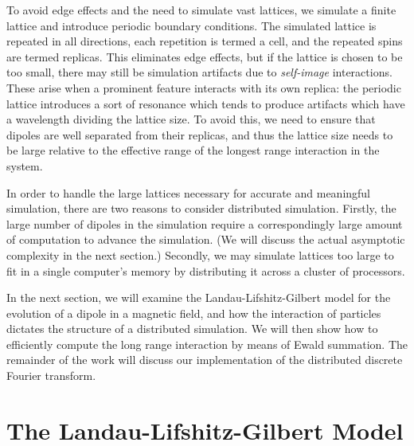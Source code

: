 \documentclass{article}
\theoremstyle{definition}
\begin{document}
To avoid edge effects and the need to simulate vast lattices, we simulate a
finite lattice and introduce periodic boundary conditions. The simulated lattice
is repeated in all directions, each repetition is termed a cell, and the
repeated spins are termed replicas. This eliminates edge effects, but if the
lattice is chosen to be too small, there may still be simulation artifacts due
to \emph{self-image} interactions. These arise when a prominent feature
interacts with its own replica: the periodic lattice introduces a sort of
resonance which tends to produce artifacts which have a wavelength dividing the
lattice size. To avoid this, we need to ensure that dipoles are well separated
from their replicas, and thus the lattice size needs to be large relative to the
effective range of the longest range interaction in the system.

In order to handle the large lattices necessary for accurate and meaningful
simulation, there are two reasons to consider distributed simulation. Firstly,
the large number of dipoles in the simulation require a correspondingly large
amount of computation to advance the simulation. (We will discuss the actual
asymptotic complexity in the next section.) Secondly, we may simulate lattices
too large to fit in a single computer's memory by distributing it across a
cluster of processors.


In the next section, we will examine the Landau-Lifshitz-Gilbert model for the
evolution of a dipole in a magnetic field, and how the interaction of particles
dictates the structure of a distributed simulation. We will then show how to
efficiently compute the long range interaction by means of Ewald summation. The
remainder of the work will discuss our implementation of the distributed
discrete Fourier transform.

\section{The Landau-Lifshitz-Gilbert Model}
\end{document}
